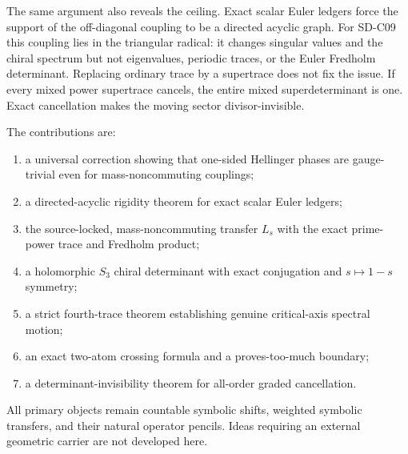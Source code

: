 The same argument also reveals the ceiling.  Exact scalar Euler ledgers force
the support of the off-diagonal coupling to be a directed acyclic graph.
For SD-C09 this coupling lies in the triangular radical: it changes singular
values and the chiral spectrum but not eigenvalues, periodic traces, or the
Euler Fredholm determinant.  Replacing ordinary trace by a supertrace does
not fix the issue.  If every mixed power supertrace cancels, the entire mixed
superdeterminant is one.  Exact cancellation makes the moving sector
divisor-invisible.

The contributions are:
\begin{enumerate}
  \item a universal correction showing that one-sided Hellinger phases are
        gauge-trivial even for mass-noncommuting couplings;
  \item a directed-acyclic rigidity theorem for exact scalar Euler ledgers;
  \item the source-locked, mass-noncommuting transfer $L_s$ with the exact
        prime-power trace and Fredholm product;
  \item a holomorphic $S_3$ chiral determinant with exact conjugation and
        $s\mapsto1-s$ symmetry;
  \item a strict fourth-trace theorem establishing genuine critical-axis
        spectral motion;
  \item an exact two-atom crossing formula and a proves-too-much boundary;
  \item a determinant-invisibility theorem for all-order graded
        cancellation.
\end{enumerate}

All primary objects remain countable symbolic shifts, weighted symbolic
transfers, and their natural operator pencils.  Ideas requiring an external
geometric carrier are not developed here.
